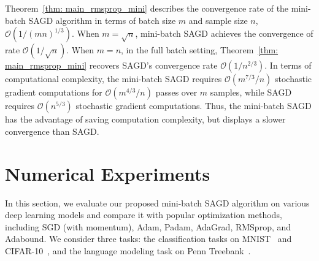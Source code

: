 \documentclass[11pt]{article}
\begin{document}
Theorem~\ref{thm: main_rmsprop_mini} 
describes the convergence rate of the mini-batch \textsc{SAGD} algorithm in terms of batch size $m$ and sample size $n$, \ie $\mathcal{O}(1/(mn)^{1/3})$.
When $m = \sqrt{n}$, mini-batch \textsc{SAGD} achieves the convergence of rate $\mathcal{O}(1/\sqrt{n})$. When $m=n$, \ie in the full batch setting, Theorem~\ref{thm: main_rmsprop_mini} recovers \textsc{SAGD}'s convergence rate  $\mathcal{O}(1/n^{2/3})$. 
In terms of computational complexity, the mini-batch \textsc{SAGD} requires $\mathcal{O}(m^{7/3}/n)$ stochastic gradient computations for $\mathcal{O}(m^{4/3}/n)$ passes over $m$ samples, while \textsc{SAGD} requires $\mathcal{O}(n^{5/3})$ stochastic gradient computations. 
Thus, the mini-batch \textsc{SAGD} has the advantage of saving computation complexity, but displays a slower convergence than \textsc{SAGD}.

\vspace{-0.05in}
\section{Numerical Experiments} \label{sec: experiment}
\vspace{-0.05in}

In this section, we evaluate our proposed mini-batch \textsc{SAGD} algorithm on various deep learning models and compare it with popular optimization methods, including SGD (with momentum), Adam, Padam,  AdaGrad,  RMSprop, and Adabound. 
We consider three tasks: the classification tasks on MNIST~\citep{lebo1998} and CIFAR-10~\citep{krhi2009}, and the language modeling task on Penn Treebank~\citep{mama1993}. 
\end{document}
